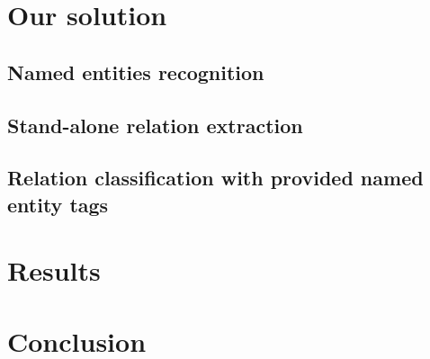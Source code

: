 \documentclass{dialogue}
\begin{document}
\section{Our solution}
\subsection{Named entities recognition}
\subsection{Stand-alone relation extraction}
\subsection{Relation classification with provided named entity tags}
\section{Results}
\section{Conclusion}

\end{document}
